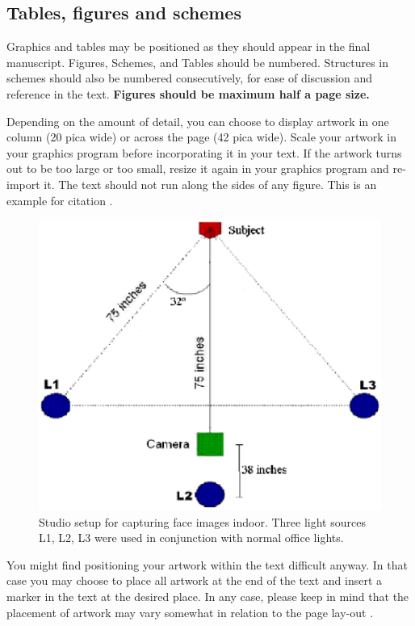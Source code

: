 \documentclass[times,onecolumn,final,longtitle]{elsarticle}
\begin{document}
\subsection{Tables, figures and schemes}
Graphics and tables may be positioned as they should appear in the
final manuscript. Figures, Schemes, and Tables should be numbered.
Structures in schemes should also be numbered consecutively, for ease
of discussion and reference in the text. \textcolor{newcolor}{\bf
  Figures should be maximum half a page size.}

Depending on the
amount of detail, you can choose to display artwork in one column (20
pica wide) or across the page (42 pica wide). Scale your artwork in
your graphics program before incorporating it in your text. If the
artwork turns out to be too large or too small, resize it again in your
graphics program and re-import it. The text should not run along the
sides of any figure. This is an example for citation \cite{NewmanGirvan2004}.

\begin{figure}[!t]
  \centering
  \includegraphics[scale=.5]{smhlfig01}
  \caption{Studio setup for capturing face images indoor. Three light
    sources L1, L2, L3 were used in conjunction with normal office lights.}
\end{figure}

You might find positioning your artwork within the text difficult
anyway. In that case you may choose to place all artwork at the end of
the text and insert a marker in the text at the desired place. In any
case, please keep in mind that the placement of artwork may vary
somewhat in relation to the page lay-out \cite{HullermeierRifqi2009}.
\end{document}
